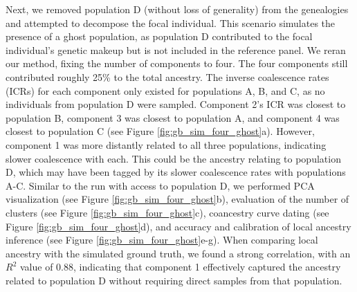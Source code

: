 
Next, we removed population D (without loss of generality) from the genealogies and attempted to decompose the focal individual. This scenario simulates the presence of a ghost population, as population D contributed to the focal individual's genetic makeup but is not included in the reference panel. We reran our method, fixing the number of components to four. The four components still contributed roughly 25\% to the total ancestry. The inverse coalescence rates (ICRs) for each component only existed for populations A, B, and C, as no individuals from population D were sampled. Component 2's ICR was closest to population B, component 3 was closest to population A, and component 4 was closest to population C (see Figure \ref{fig:gb_sim_four_ghost}a). However, component 1 was more distantly related to all three populations, indicating slower coalescence with each. This could be the ancestry relating to population D, which may have been tagged by its slower coalescence rates with populations A-C. Similar to the run with access to population D, we performed PCA visualization (see Figure \ref{fig:gb_sim_four_ghost}b), evaluation of the number of clusters (see Figure \ref{fig:gb_sim_four_ghost}c), coancestry curve dating (see Figure \ref{fig:gb_sim_four_ghost}d), and accuracy and calibration of local ancestry inference (see Figure \ref{fig:gb_sim_four_ghost}e-g). When comparing local ancestry with the simulated ground truth, we found a strong correlation, with an $R^2$ value of $0.88$, indicating that component 1 effectively captured the ancestry related to population D without requiring direct samples from that population.

